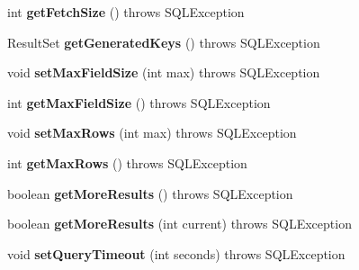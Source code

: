 \begin{DoxyCompactItemize}
int {\bfseries get\+Fetch\+Size} ()  throws S\+Q\+L\+Exception 
\item 
\mbox{\label{classcom_1_1mysql_1_1cj_1_1jdbc_1_1_statement_wrapper_a8aa26b3673b2f5b4a312cb8bb28c9f3b}} 
Result\+Set {\bfseries get\+Generated\+Keys} ()  throws S\+Q\+L\+Exception 
\item 
\mbox{\label{classcom_1_1mysql_1_1cj_1_1jdbc_1_1_statement_wrapper_aa1d8fbcb6d13390a8d7bf3cd9cec3b85}} 
void {\bfseries set\+Max\+Field\+Size} (int max)  throws S\+Q\+L\+Exception 
\item 
\mbox{\label{classcom_1_1mysql_1_1cj_1_1jdbc_1_1_statement_wrapper_ac3faa33afc9f710c2179b446831389c1}} 
int {\bfseries get\+Max\+Field\+Size} ()  throws S\+Q\+L\+Exception 
\item 
\mbox{\label{classcom_1_1mysql_1_1cj_1_1jdbc_1_1_statement_wrapper_aa312a016fd837074a60a71caf73782d6}} 
void {\bfseries set\+Max\+Rows} (int max)  throws S\+Q\+L\+Exception 
\item 
\mbox{\label{classcom_1_1mysql_1_1cj_1_1jdbc_1_1_statement_wrapper_a01684e81b28e073167d4383bc3c94f19}} 
int {\bfseries get\+Max\+Rows} ()  throws S\+Q\+L\+Exception 
\item 
\mbox{\label{classcom_1_1mysql_1_1cj_1_1jdbc_1_1_statement_wrapper_a57530b5e0e25dab299d5e4b6eb659cf3}} 
boolean {\bfseries get\+More\+Results} ()  throws S\+Q\+L\+Exception 
\item 
\mbox{\label{classcom_1_1mysql_1_1cj_1_1jdbc_1_1_statement_wrapper_a56a13d2b4e4865896ce4c0e10a7f9a67}} 
boolean {\bfseries get\+More\+Results} (int current)  throws S\+Q\+L\+Exception 
\item 
\mbox{\label{classcom_1_1mysql_1_1cj_1_1jdbc_1_1_statement_wrapper_a26f8947b44321bdf8d810ff448e22be6}} 
void {\bfseries set\+Query\+Timeout} (int seconds)  throws S\+Q\+L\+Exception 

\end{DoxyCompactItemize}
